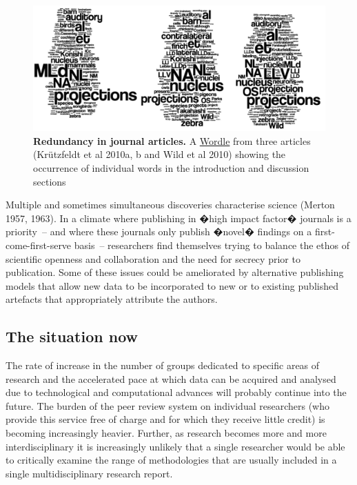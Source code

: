 \documentclass[final,authoryear,3p]{elsarticle-open-drafting}
\begin{document}
\begin{figure}[!ht]
	\begin{center}
		\includegraphics[width=13cm]{Images/Papers-wordle.png}
		\caption{
		{\bf Redundancy in journal articles.} A \href{http://www.wordle.net}{Wordle} from three articles (Kr{\"u}tzfeldt et al 2010a, b and Wild et al 2010) showing the occurrence of individual words in the introduction and discussion sections
		}
		\label{Figure:Wordle}
	\end{center}
\end{figure}


Multiple and sometimes simultaneous discoveries characterise science (Merton 1957, 1963). In a climate where publishing in �high impact factor� journals is a priority~-- and where these journals only publish �novel� findings on a first-come-first-serve 
basis~-- researchers find themselves trying to balance the ethos of scientific openness and collaboration and the need for 
secrecy prior to publication. Some of these issues could be ameliorated by alternative publishing models that allow new data to 
be incorporated to new or to existing published artefacts that appropriately attribute the authors.

\subsection{The situation now}

The rate of increase in the number of groups dedicated to specific areas of research and the accelerated pace at which data can 
be acquired and analysed due to technological and computational advances will probably continue into the future. The burden of 
the peer review system on individual researchers (who provide this service free of charge and for which they receive little credit) 
is becoming increasingly heavier. Further, as research becomes more and more interdisciplinary it is increasingly unlikely that a 
single researcher would be able to critically examine the range of methodologies that are usually included in a single 
multidisciplinary research report.
\end{document}
